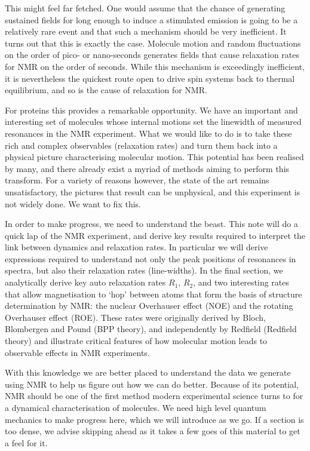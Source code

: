 \documentclass[notitlepage,11pt]{article}
\begin{document}
This might feel far fetched. One would assume that the chance of generating sustained fields for long enough to induce a stimulated emission is going to be a relatively rare event and that such a mechanism should be very inefficient. It turns out that this is exactly the case. Molecule motion and random fluctuations on the order of pico- or nano-seconds generates fields that cause relaxation rates for NMR on the order of seconds. While this mechanism is exceedingly inefficient, it is nevertheless the quickest route open to drive spin systems back to thermal equilibrium, and so is the cause of relaxation for NMR.

For proteins this provides a remarkable opportunity. We have an important and interesting set of molecules whose internal motions set the linewidth of measured resonances in the NMR experiment. What we would like to do is to take these rich and complex observables (relaxation rates) and turn them back into a physical picture characterising molecular motion. This potential has been realised by many, and there already exist a myriad of methods aiming to perform this transform. For a variety of reasons however, the state of the art remains unsatisfactory, the pictures that result can be unphysical, and this experiment is not widely done. We want to fix this.

In order to make progress, we need to understand the beast. This note will do a quick lap of the NMR experiment, and derive key results required to interpret the link between dynamics and relaxation rates. In particular we will derive expressions required to understand not only the peak positions of resonances in spectra, but also their relaxation rates (line-widths). In the final section, we analytically derive key auto relaxation rates $R_1$, $R_2$, and two interesting rates that allow magnetisation to `hop' between atoms that form the basis of structure determination by NMR: the nuclear Overhauser effect (NOE) and the rotating Overhauser effect (ROE). These rates were originally derived by Bloch, Blombergen and Pound (BPP theory), and independently by Redfield (Redfield theory) and illustrate critical features of how molecular motion leads to observable effects in NMR experiments.

With this knowledge we are better placed to understand the data we generate using NMR to help us figure out how we can do better. Because of its potential, NMR should be one of the first method modern experimental science turns to for a dynamical characterisation of molecules. We need high level quantum mechanics to make progress here, which we will introduce as we go. If a section is too dense, we advise skipping ahead as it takes a few goes of this material to get a feel for it. 
\end{document}
